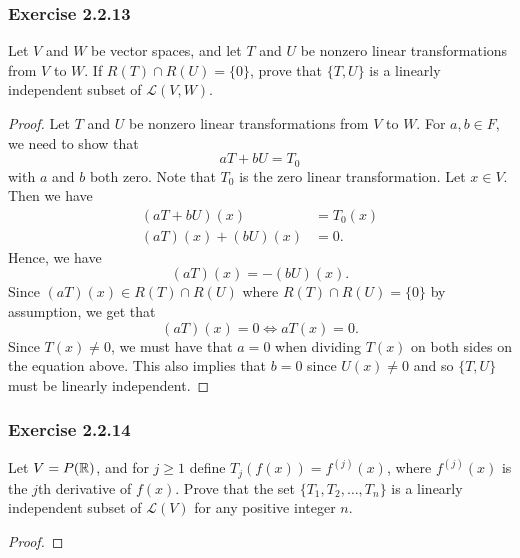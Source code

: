 \subsubsection{Exercise 2.2.13} Let \( V  \) and \( W  \) be vector spaces, and let \( T  \) and \( U  \) be nonzero linear transformations from \( V  \) to \( W  \). If \( R(T) \cap R(U) = \{ 0  \}   \), prove that \( \{ T, U  \}   \) is a linearly independent subset of \( \mathcal{L}(V, W ) \).
\begin{proof}
Let \( T \) and \( U  \) be nonzero linear transformations from \( V  \) to \( W  \). For \( a,b \in F  \), we need to show that 
\[  aT + bU = {T}_{0} \] with \( a  \) and \( b  \) both zero. Note that \( {T}_{0} \) is the zero linear transformation. Let \( x \in V  \). Then we have
\begin{align*}
    (aT + bU)(x) &= {T}_{0}(x)  \\
    (aT)(x) + (bU)(x) &= 0. 
\end{align*}
Hence, we have
\[  (aT)(x) = -(bU)(x).  \]
Since \( (aT)(x) \in R(T) \cap R(U) \) where \( R(T) \cap R(U) = \{ 0  \}   \) by assumption, we get that
\[  (aT)(x) = 0 \iff aT(x) = 0. \]
Since \( T(x) \neq 0  \), we must have that \( a = 0  \) when dividing \( T(x)  \) on both sides on the equation above. This also implies that \( b = 0  \) since \( U(x) \neq 0  \) and so \( \{ T, U  \}  \) must be linearly independent.
\end{proof}

\subsubsection{Exercise 2.2.14} Let \( V = P(\mathbb{R}) \), and for \( j \geq 1   \) define \( {T}_{j}(f(x)) = f^{(j)}(x)  \), where \( f^{(j)}(x) \) is the \( j \)th derivative of \( f(x) \). Prove that the set \( \{ {T}_{1}, {T}_{2}, \dots, {T}_{n} \}  \) is a linearly independent subset of \( \mathcal{L}(V) \) for any positive integer \( n \).
\begin{proof}

\end{proof}

